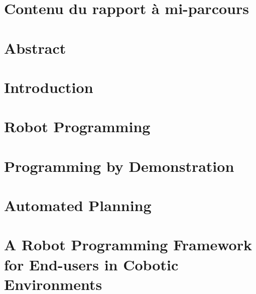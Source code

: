 \documentclass[a4paper,12pt,twoside,openany]{book}
\theoremstyle{definition}
\theoremstyle{remark}
\begin{document}

 \maketitle


\chapter*{Contenu du rapport \`{a} mi-parcours}


\chapter*{Abstract}


\tableofcontents
\listoffigures


\chapter{Introduction} \label{chap:Intro}


\chapter{Robot Programming}\label{chap:Sota}

\chapter{Programming by Demonstration}\label{chap:Sota-PbD}


\chapter{Automated Planning}\label{chap:Sota-AP}


\chapter{A Robot Programming Framework for End-users in Cobotic Environments}\label{chap:Contribution}


%
\end{document}
